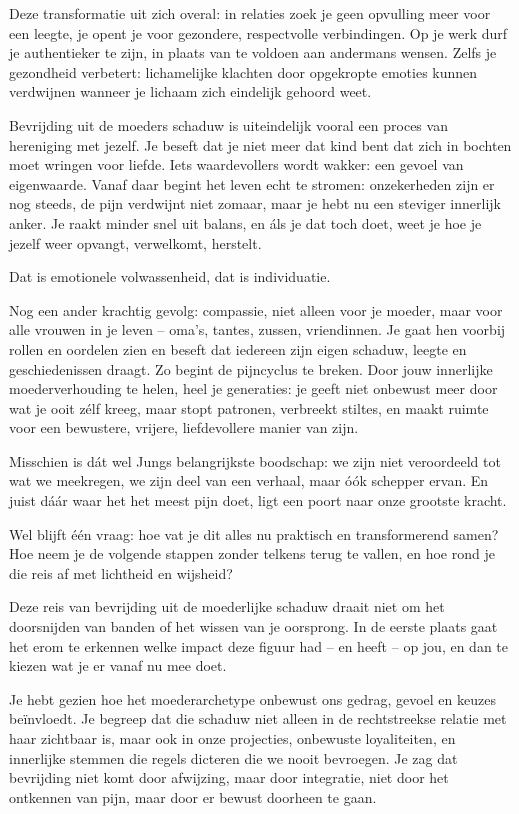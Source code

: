 Deze transformatie uit zich overal: in relaties zoek je geen opvulling meer voor een leegte, je opent je voor gezondere, respectvolle verbindingen. Op je werk durf je authentieker te zijn, in plaats van te voldoen aan andermans wensen. Zelfs je gezondheid verbetert: lichamelijke klachten door opgekropte emoties kunnen verdwijnen wanneer je lichaam zich eindelijk gehoord weet.

Bevrijding uit de moeders schaduw is uiteindelijk vooral een proces van hereniging met jezelf. Je beseft dat je niet meer dat kind bent dat zich in bochten moet wringen voor liefde. Iets waardevollers wordt wakker: een gevoel van eigenwaarde. Vanaf daar begint het leven echt te stromen: onzekerheden zijn er nog steeds, de pijn verdwijnt niet zomaar, maar je hebt nu een steviger innerlijk anker. Je raakt minder snel uit balans, en áls je dat toch doet, weet je hoe je jezelf weer opvangt, verwelkomt, herstelt.

Dat is emotionele volwassenheid, dat is individuatie.

Nog een ander krachtig gevolg: compassie, niet alleen voor je moeder, maar voor alle vrouwen in je leven – oma’s, tantes, zussen, vriendinnen. Je gaat hen voorbij rollen en oordelen zien en beseft dat iedereen zijn eigen schaduw, leegte en geschiedenissen draagt. Zo begint de pijncyclus te breken. Door jouw innerlijke moederverhouding te helen, heel je generaties: je geeft niet onbewust meer door wat je ooit zélf kreeg, maar stopt patronen, verbreekt stiltes, en maakt ruimte voor een bewustere, vrijere, liefdevollere manier van zijn.

Misschien is dát wel Jungs belangrijkste boodschap: we zijn niet veroordeeld tot wat we meekregen, we zijn deel van een verhaal, maar óók schepper ervan. En juist dáár waar het het meest pijn doet, ligt een poort naar onze grootste kracht.

Wel blijft één vraag: hoe vat je dit alles nu praktisch en transformerend samen? Hoe neem je de volgende stappen zonder telkens terug te vallen, en hoe rond je die reis af met lichtheid en wijsheid?

Deze reis van bevrijding uit de moederlijke schaduw draait niet om het doorsnijden van banden of het wissen van je oorsprong. In de eerste plaats gaat het erom te erkennen welke impact deze figuur had – en heeft – op jou, en dan te kiezen wat je er vanaf nu mee doet.

Je hebt gezien hoe het moederarchetype onbewust ons gedrag, gevoel en keuzes beïnvloedt. Je begreep dat die schaduw niet alleen in de rechtstreekse relatie met haar zichtbaar is, maar ook in onze projecties, onbewuste loyaliteiten, en innerlijke stemmen die regels dicteren die we nooit bevroegen. Je zag dat bevrijding niet komt door afwijzing, maar door integratie, niet door het ontkennen van pijn, maar door er bewust doorheen te gaan.


